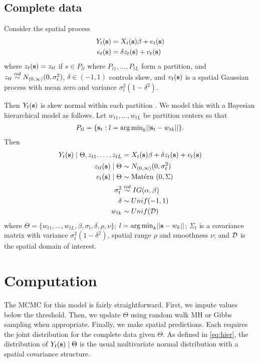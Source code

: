 \documentclass[11pt]{article}
\begin{document}
\subsection{Complete data}\label{s:model}
Consider the spatial process
\begin{align} \label{eq:fullmodel}
  Y_t(\mbox{\bf s}) &= X_t(\mbox{\bf s}) \beta + e_t(\mbox{\bf s})\\
  e_t(\mbox{\bf s}) &= \delta z_t(\mbox{\bf s}) + v_t(\mbox{\bf s})
\end{align}
where $z_t(\mbox{\bf s}) = z_{tl}$ if $s \in P_{tl}$ where $P_{t1}, \ldots, P_{tL}$ form a partition, and $z_{tl} \stackrel{iid}{\sim} N_{(0, \infty)}(0, \sigma_t^2)$, $\delta \in (-1, 1)$ controls skew, and $v_t(\mbox{\bf s})$ is a spatial Gaussian process with mean zero and variance $\sigma_t^2(1 - \delta^2)$.

Then $Y_t(\mbox{\bf s})$ is skew normal within each partition \citep{Minozzo2012}.
We model this with a Bayesian hierarchical model as follows.
Let $w_{t1}, \ldots, w_{tL}$ be partition centers so that
\begin{align*}
  P_{tl} = \{\mbox{\bf s}_t : l = {\mathop{\rm arg\, min}}_k || \mbox{\bf s}_t - w_{tk} ||\}.
\end{align*}
Then
\begin{align}
    Y_t(\mbox{\bf s}) \mid \Theta, z_{t1}, \ldots, z_{tL} &= X_t(\mbox{\bf s}) \beta + \delta z_t(\mbox{\bf s}) + v_t(\mbox{\bf s}) \label{eq:hier}\\
    z_{tl}(\mbox{\bf s}) \mid \Theta &\sim N_{(0, \infty)}(0, \sigma^2_t)\\
    v_t(\mbox{\bf s}) \mid \Theta &\sim \mbox{Mat$\acute{\mbox{e}}$rn }(0, \Sigma)\\
    \sigma^2_t &\stackrel{iid}{\sim} IG(\alpha, \beta)\\
    \delta &\sim Unif(-1, 1)\\
    w_{tk} &\sim Unif({\cal D})
\end{align}
where $\Theta = \{w_{t1}, \ldots, w_{tL}, \beta, \sigma_t, \delta, \rho, \nu \}$; $l = {\mathop{\rm arg\, min}}_k ||\mbox{\bf s} - w_k ||$; $\Sigma_t$ is a \Matern covariance matrix with variance $\sigma_t^2 (1 - \delta^2)$, spatial range $\rho$ and smoothness $\nu$; and ${\cal D}$ is the spatial domain of interest.

\section{Computation}\label{s:comp}
The MCMC for this model is fairly straightforward.
First, we impute values below the threshold.
Then, we update $\Theta$ using random walk MH or Gibbs sampling when appropriate.
Finally, we make spatial predictions.
Each requires the joint distribution for the complete data given $\Theta$.
As defined in \ref{eq:hier}, the distribution of $Y_t(\mbox{\bf s}) \mid \Theta$ is the usual multivariate normal distribution with a \Matern spatial covariance structure.
\end{document}
